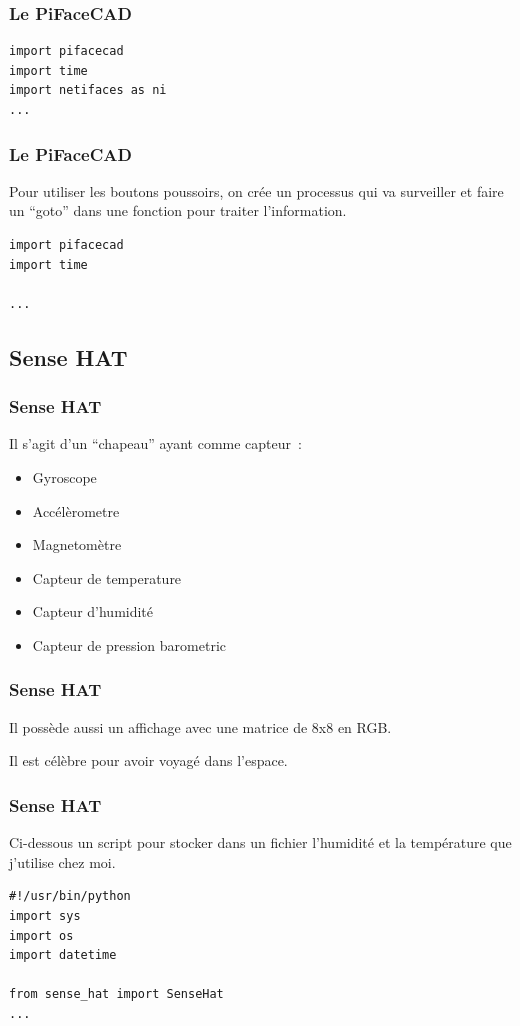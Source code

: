  \begin{frame}[containsverbatim]
\frametitle{Le PiFaceCAD}
 
 \begin{verbatim}
import pifacecad
import time
import netifaces as ni
...
\end{verbatim}

\end{frame}

\begin{frame}[containsverbatim]
\frametitle{Le PiFaceCAD}
 
Pour utiliser les boutons poussoirs, on crée un processus qui va surveiller et faire un ``goto'' dans une fonction pour traiter l'information.

\begin{verbatim}
import pifacecad
import time

...
\end{verbatim}

\end{frame}


\subsection{Sense HAT}

\begin{frame}[containsverbatim]
\frametitle{Sense HAT}

Il s'agit d'un ``chapeau'' ayant comme capteur~:
\begin{itemize}
    \item Gyroscope
    \item Accélèrometre
    \item Magnetomètre
    \item Capteur de temperature
    \item Capteur d'humidité
    \item Capteur de pression barometric
\end{itemize}
\end{frame}

\begin{frame}[containsverbatim]
\frametitle{Sense HAT}

Il possède aussi un affichage avec une matrice de 8x8 en RGB.

Il est célèbre pour avoir voyagé dans l'espace.

\end{frame}

\begin{frame}[containsverbatim]
\frametitle{Sense HAT}

Ci-dessous un script pour stocker dans un fichier l'humidité et la température que j'utilise chez moi.

\begin{verbatim}
#!/usr/bin/python
import sys
import os
import datetime

from sense_hat import SenseHat
...
\end{verbatim}

\end{frame}